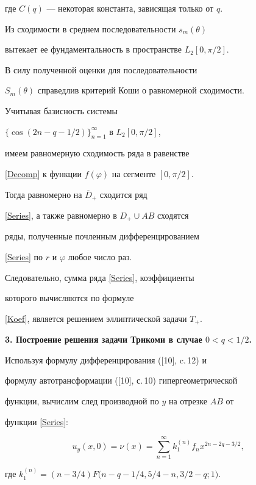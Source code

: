 где $C(q)$ --- некоторая константа, зависящая только от $q$.





Из сходимости в среднем последовательности $s_{m}(\theta)$ 


вытекает ее фундаментальность в пространстве $L_2[0,\pi/2]$. 


В силу полученной оценки для последовательности


$S_{m}(\theta)$ справедлив критерий Коши о равномерной сходимости. 


Учитывая базисность системы


$\{\cos(2n-q-1/2)\}_{n=1}^{\infty}$ в $L_2[0,\pi/2]$,


имеем равномерную сходимость ряда в равенстве


\eqref{Decomp} к функции $f(\varphi)$ на сегменте $[0,\pi/2]$.


Тогда равномерно на $\overline{D}_+$ сходится ряд


\eqref{Series}, а также равномерно в $D_+\cup AB$ сходятся


ряды, полученные почленным дифференцированием


\eqref{Series} по $r$ и $\varphi$ любое число раз.


Следовательно, сумма ряда \eqref{Series}, коэффициенты


которого вычисляются по формуле


\eqref{Koef}, является решением эллиптической задачи $T_+$.


\medskip








{\bf 3. Построение решения задачи Трикоми в случае $0<q<1/2$.}


Используя формулу дифференцирования ([10], c.\,12) и


формулу автотрансформации ([10], с.\,10) гипергеометрической


функции, вычислим след производной по $y$ на отрезке $AB$ от


функции \eqref{Series}:


\begin{equation}\label{Dseries}


u_y(x,0)= \nu(x)=\sum_{n=1}^\infty k_{1}^{(n)}f_nx^{2n-2q-3/2},


\end{equation}


где $k_{1}^{(n)}=(n-3/4)F\big(n-q-1/4,5/4-n,3/2-q;1\big)$.



